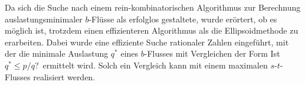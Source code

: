 Da sich die Suche nach einem rein-kombinatorischen Algorithmus zur Berechnung auslastungsminimaler $b$-Flüsse als erfolglos gestaltete, wurde erörtert, ob es möglich ist, trotzdem einen effizienteren Algorithmus als die Ellipsoidmethode zu erarbeiten.
Dabei wurde eine effiziente Suche rationaler Zahlen eingeführt, mit der die minimale Auslastung $q^*$ eines $b$-Flusses mit Vergleichen der Form \glqq Ist $q^*\leq p/q$?\grqq\ ermittelt wird.
Solch ein Vergleich kann mit einem maximalen $s$-$t$-Flusses realisiert werden.

